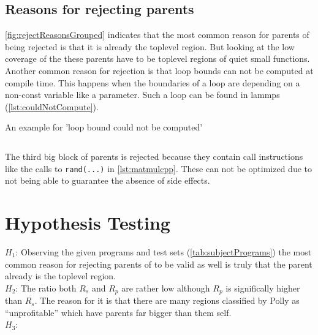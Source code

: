 \subsection{Reasons for rejecting parents}
\autoref{fig:rejectReasonsGrouped} indicates that the most common reason for parents of \scops being rejected is that it is already the toplevel region.
But looking at the low coverage of the \scops these parents have to be toplevel regions of quiet small functions.\\
Another common reason for rejection is that loop bounds can not be computed at compile time.
This happens \eg when the boundaries of a loop are depending on a non-const variable like a parameter.
Such a loop can be found in lammps (\autoref{lst:couldNotCompute}).
\begin{code}
    \caption{An example for 'loop bound could not be computed'}
    \inputminted{c}{c/nonAffineLoopBoundCouldNotCompute.c}
    \label{lst:couldNotCompute}
\end{code}
The third big block of parents is rejected because they contain call instructions like the calls to \texttt{rand(...)} in \autoref{lst:matmulcpp}.
These can not be optimized due to not being able to guarantee the absence of side effects.\\
\section{Hypothesis Testing}
\(H_1\): Observing the given programs and test sets (\autoref{tab:subjectPrograms}) the most common reason for rejecting parents of \scop to be valid as well is truly that the parent already is the toplevel region.\\
\(H_2\): The ratio both \(R_s\) and \(R_p\) are rather low although \(R_p\) is significally higher than \(R_s\).
The reason for it is that there are many regions classified by Polly as \enquote{unprofitable} which have parents far bigger than them self.\\
\(H_3\): \\

